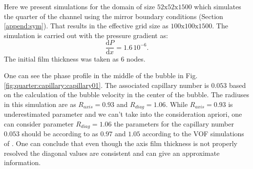 \documentclass{article}
\begin{document}
Here we present simulations for the domain of size $52\mathrm{x}52\mathrm{x}1500$ which simulates
the quarter of the channel using the mirror boundary conditions (Section \ref{append:sym}). That
results in the effective grid size as $100\mathrm{x}100\mathrm{x}1500$. The simulation is carried
out with the pressure gradient as:
\begin{equation}
\frac{\mathrm{d}P}{\mathrm{d}x}=1.6\,10^{-6}.
\end{equation}
The initial film thickness was taken as $6$ nodes. 

One can see the phase profile in the middle of the bubble in
Fig.\ref{fig:quarter:capillary:capillary01}. The associated capillary number is $0.053$ based on
the calculation of the bubble velocity in the center of the bubble. The radiuses in this simulation
are as $R_{axis}=0.93$ and $R_{diag}=1.06$. While $R_{axis}=0.93$ is underestimated parameter and
we can't take into the consideration apriori, one can consider parameter $R_{diag}=1.06$ the
parameters for the capillary number $0.053$ should be according to \citet{heil-threedim} as $0.97$
and $1.05$ according to the VOF simulations of \citet{wang-non-circular}. One can conclude that
even though the axis film thickness is not properly resolved the diagonal values are consistent and
can give an approximate information. 
\end{document}
